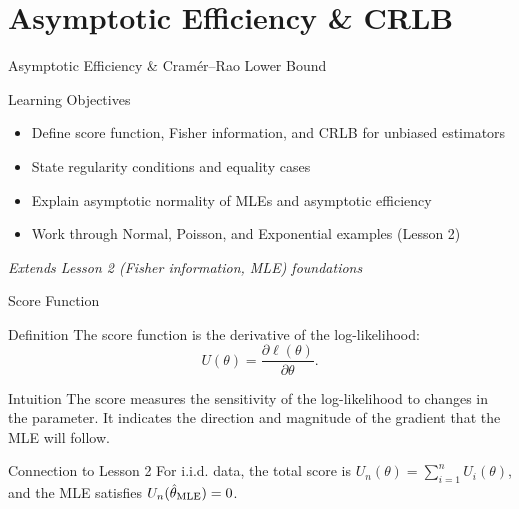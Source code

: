 
\section{Asymptotic Efficiency \& CRLB}

\begin{frame}{Asymptotic Efficiency \& Cramér--Rao Lower Bound}
  \begin{block}{Learning Objectives}
    \begin{itemize}
      \item Define score function, Fisher information, and CRLB for unbiased estimators
      \item State regularity conditions and equality cases
      \item Explain asymptotic normality of MLEs and asymptotic efficiency
      \item Work through Normal, Poisson, and Exponential examples (Lesson 2)
    \end{itemize}
  \end{block}

  \vspace{1em}
  \begin{center}
    \textit{Extends Lesson 2 (Fisher information, MLE) foundations}
  \end{center}
\end{frame}

\begin{frame}{Score Function}
  \begin{block}{Definition}
    The score function is the derivative of the log-likelihood:
    \[U(\theta) = \frac{\partial \ell(\theta)}{\partial \theta}.\]
  \end{block}

  \begin{block}{Intuition}
    The score measures the sensitivity of the log-likelihood to changes
    in the parameter. It indicates the direction and magnitude of the
    gradient that the MLE will follow.
  \end{block}

  \begin{block}{Connection to Lesson 2}
    For i.i.d. data, the total score is $U_n(\theta) = \sum_{i=1}^n U_i(\theta)$,
    and the MLE satisfies $U_n(\hat{\theta}_{\text{MLE}}) = 0$.
  \end{block}
\end{frame}

